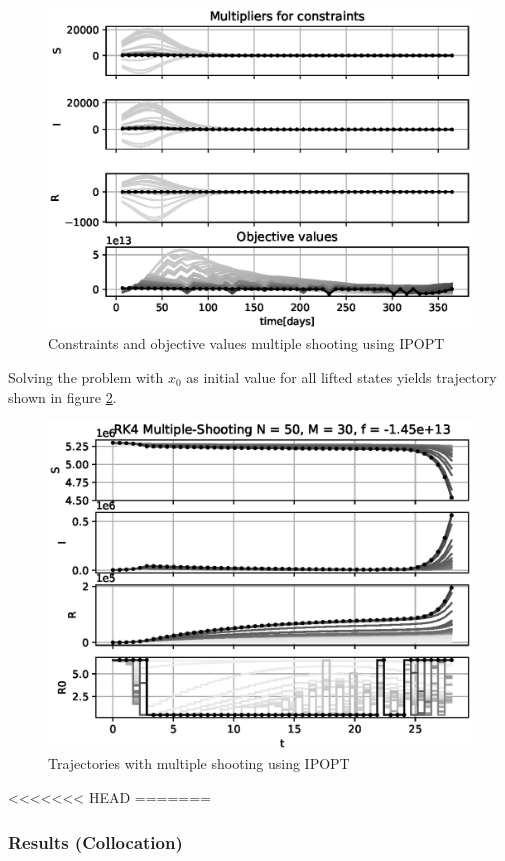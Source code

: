 \begin{figure}[H]
    \centering
    \includegraphics[width=.8\textwidth]{pythonProject/Figures/Multiple_Shooting_obj_con_IPOPT_traj_initial_Social_Distancing.eps}
    \caption{Constraints and objective values multiple shooting using IPOPT}
    \label{fig:MS_Cons_Obj_IPOPT}
\end{figure}

Solving the problem with $x_0$ as initial value for all lifted states yields trajectory shown in figure \ref{fig:MS_Traj_IPOPT}.

\begin{figure}[H]
    \centering
    \includegraphics[width=.8\textwidth]{pythonProject/Figures/Multiple_Shooting_Trajectory_IPOPT.eps}
    \caption{Trajectories with multiple shooting using IPOPT}
    \label{fig:MS_Traj_IPOPT}
\end{figure}

<<<<<<< HEAD
=======
\subsubsection{Results (Collocation)}


